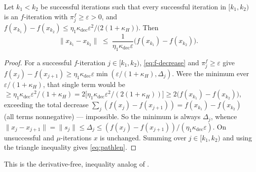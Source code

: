 \begin{lemma}
  \label{lem:pathlen}
  Let $k_1<k_2$ be successful iterations such that every successful iteration in
  $[k_1,k_2)$ is an $f$-iteration with $\pi_j^f\ge\varepsilon>0$, and
  $f(x_{k_1})-f(x_{k_2})\le\eta_1\kappa_{\mathrm{dec}}\varepsilon^2/\bigl(2(1+\kappa_H)\bigr)$.
  Then
  \begin{equation}
    \label{eq:pathlen}
    \|x_{k_1}-x_{k_2}\| \;\le\; \frac{1}{\eta_1\kappa_{\mathrm{dec}}\varepsilon}\bigl(f(x_{k_1})-f(x_{k_2})\bigr).
  \end{equation}
\end{lemma}
\begin{proof}
  For a successful $f$-iteration $j\in[k_1,k_2)$, \eqref{eq:f-decrease} and
  $\pi_j^f\ge\varepsilon$ give
  $f(x_j)-f(x_{j+1})\ge\eta_1\kappa_{\mathrm{dec}}\varepsilon\min(\varepsilon/(1+\kappa_H),\Delta_j)$.
  Were the minimum ever $\varepsilon/(1+\kappa_H)$, that single term would be
  $\ge\eta_1\kappa_{\mathrm{dec}}\varepsilon^2/(1+\kappa_H)=2\bigl[\eta_1\kappa_{\mathrm{dec}}\varepsilon^2/(2(1+\kappa_H))\bigr]\ge2\bigl(f(x_{k_1})-f(x_{k_2})\bigr)$,
  exceeding the total decrease $\sum_j(f(x_j)-f(x_{j+1}))=f(x_{k_1})-f(x_{k_2})$ (all
  terms nonnegative) --- impossible. So the minimum is always $\Delta_j$, whence
  $\|x_j-x_{j+1}\|=\|s_j\|\le\Delta_j\le(f(x_j)-f(x_{j+1}))/(\eta_1\kappa_{\mathrm{dec}}\varepsilon)$.
  On unsuccessful and $\mu$-iterations $x$ is unchanged. Summing over $j\in[k_1,k_2)$
  and using the triangle inequality gives \eqref{eq:pathlen}.
\end{proof}
This is the derivative-free, inequality analog of \citet[Lemma~3.20]{GouldToint2010}.

